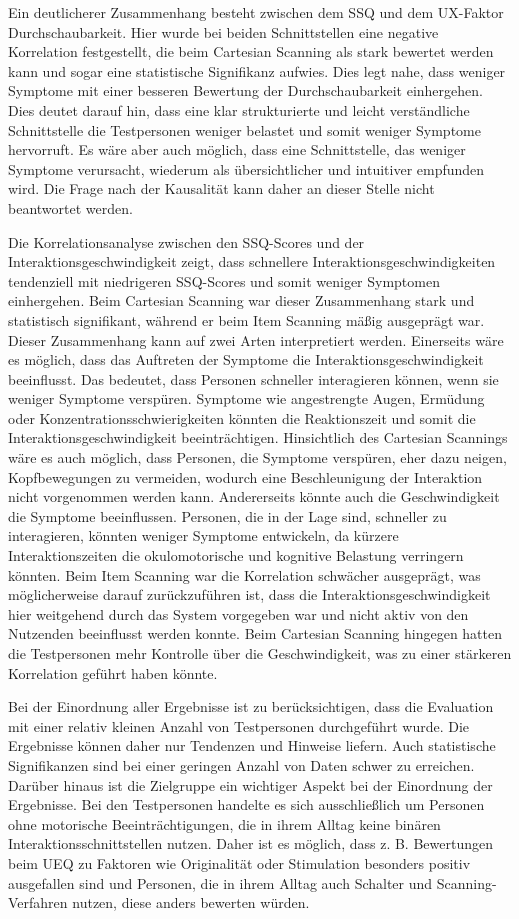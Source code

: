Ein deutlicherer Zusammenhang besteht zwischen dem SSQ und dem UX-Faktor Durchschaubarkeit. Hier wurde bei beiden Schnittstellen eine negative Korrelation festgestellt, die beim Cartesian Scanning als stark bewertet werden kann und sogar eine statistische Signifikanz aufwies. Dies legt nahe, dass weniger Symptome mit einer besseren Bewertung der Durchschaubarkeit einhergehen. Dies deutet darauf hin, dass eine klar strukturierte und leicht verständliche Schnittstelle die Testpersonen weniger belastet und somit weniger Symptome hervorruft. Es wäre aber auch möglich, dass eine Schnittstelle, das weniger Symptome verursacht, wiederum als übersichtlicher und intuitiver empfunden wird. Die Frage nach der Kausalität kann daher an dieser Stelle nicht beantwortet werden. 

Die Korrelationsanalyse zwischen den SSQ-Scores und der Interaktionsgeschwindigkeit zeigt, dass schnellere Interaktionsgeschwindigkeiten tendenziell mit niedrigeren SSQ-Scores und somit weniger Symptomen einhergehen. Beim Cartesian Scanning war dieser Zusammenhang stark und statistisch signifikant, während er beim Item Scanning mäßig ausgeprägt war. Dieser Zusammenhang kann auf zwei Arten interpretiert werden. Einerseits wäre es möglich, dass das Auftreten der Symptome die Interaktionsgeschwindigkeit beeinflusst. Das bedeutet, dass Personen schneller interagieren können, wenn sie weniger Symptome verspüren. Symptome wie angestrengte Augen, Ermüdung oder Konzentrationsschwierigkeiten könnten die Reaktionszeit und somit die Interaktionsgeschwindigkeit beeinträchtigen. Hinsichtlich des Cartesian Scannings wäre es auch möglich, dass Personen, die Symptome verspüren, eher dazu neigen, Kopfbewegungen zu vermeiden, wodurch eine Beschleunigung der Interaktion nicht vorgenommen werden kann. Andererseits könnte auch die Geschwindigkeit die Symptome beeinflussen. Personen, die in der Lage sind, schneller zu interagieren, könnten weniger Symptome entwickeln, da kürzere Interaktionszeiten die okulomotorische und kognitive Belastung verringern könnten.
Beim Item Scanning war die Korrelation schwächer ausgeprägt, was möglicherweise darauf zurückzuführen ist, dass die Interaktionsgeschwindigkeit hier weitgehend durch das System vorgegeben war und nicht aktiv von den Nutzenden beeinflusst werden konnte. Beim Cartesian Scanning hingegen hatten die Testpersonen mehr Kontrolle über die Geschwindigkeit, was zu einer stärkeren Korrelation geführt haben könnte.

Bei der Einordnung aller Ergebnisse ist zu berücksichtigen, dass die Evaluation mit einer relativ kleinen Anzahl von Testpersonen durchgeführt wurde. Die Ergebnisse können daher nur Tendenzen und Hinweise liefern. Auch statistische Signifikanzen sind bei einer geringen Anzahl von Daten schwer zu erreichen. 
Darüber hinaus ist die Zielgruppe ein wichtiger Aspekt bei der Einordnung der Ergebnisse. Bei den Testpersonen handelte es sich ausschließlich um Personen ohne motorische Beeinträchtigungen, die in ihrem Alltag keine binären Interaktionsschnittstellen nutzen. Daher ist es möglich, dass z. B. Bewertungen beim UEQ zu Faktoren wie Originalität oder Stimulation besonders positiv ausgefallen sind und Personen, die in ihrem Alltag auch Schalter und Scanning-Verfahren nutzen, diese anders bewerten würden. 

